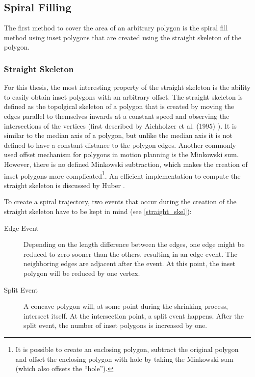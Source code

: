 \subsection{Spiral Filling}

The first method to cover the area of an arbitrary polygon is the spiral fill method using inset polygons that are created using the straight skeleton of the polygon.

\subsubsection{Straight Skeleton}

For this thesis, the most interesting property of the straight skeleton is the ability to easily obtain inset polygons with an arbitrary offset. The straight skeleton is defined as the topolgical skeleton of a polygon that is created by moving the edges parallel to themselves inwards at a constant speed and observing the intersections of the vertices (first described by Aichholzer et al. (1995) \cite{Aichholzer:jucs_1_12:a_novel_type_of}). 
It is similar to the median axis of a polygon, but unlike the median axis it is not defined to have a constant distance to the polygon edges. 
Another commonly used offset mechanism for polygons in motion planning is the Minkowski sum. However, there is no defined Minkowski subtraction, which makes the creation of inset polygons more complicated\footnote{It is possible to create an enclosing polygon, subtract the original polygon and offset the enclosing polygon with hole by taking the Minkowski sum (which also offsets the \enquote{hole}).}. An efficient implementation to compute the straight skeleton is discussed by Huber \cite{huber2010computing}.

To create a spiral trajectory, two events that occur during the creation of the straight skeleton have to be kept in mind (see \autoref{straight_skel}): 

\begin{description}
\item[Edge Event] Depending on the length difference between the edges, one edge might be reduced to zero sooner than the others, resulting in an edge event. The neighboring edges are adjacent after the event. At this point, the inset polygon will be reduced by one vertex.
\item[Split Event] A concave polygon will, at some point during the shrinking process, intersect itself. At the intersection point, a split event happens. After the split event, the number of inset polygons is increased by one.
\end{description}

